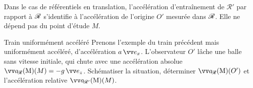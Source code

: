 \documentclass[12pt,fancy]{cours}
\begin{document}
\noindent Dans le cas de référentiels en translation, l'accélération d'entraînement de $\mathcal{R'}$ par rapport à $\mathcal{R}$ s'identifie à l'accélération de l'origine $O'$ mesurée dans $\mathcal{R}$. Elle ne dépend pas du point d'étude $M$.

\begin{exemple}{Train uniformément accéléré}
Prenons l’exemple du train précédent mais uniformément accéléré, d'accélération $a\,\ex$. L'observateur $O'$ lâche une balle sans vitesse initiale, qui chute avec une accélération absolue $\aR(M)=-g\,\ez$. Schématiser la situation, déterminer $\aR(O')$ et l'accélération relative $\aRp(M)$.

\end{exemple}
%
%
\end{document}
